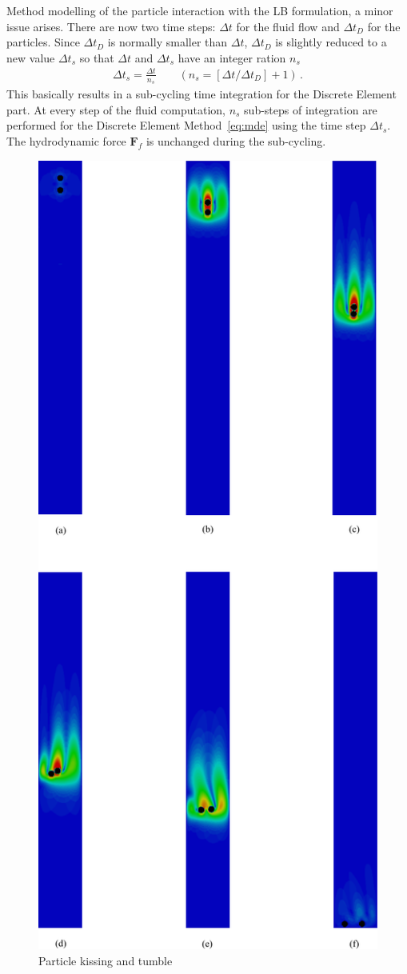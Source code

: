 Method modelling of the particle interaction with the LB formulation, a minor 
issue arises. There are now two time steps: $\Delta t$ for the fluid flow and 
$\Delta t_{D}$ for the particles. Since $\Delta t_{D}$ is normally smaller than 
$\Delta t$, $\Delta t_{D}$ is slightly reduced to a new value $\Delta t_{s}$ so 
that $\Delta t$ and $\Delta t_{s}$ have an integer ration 
$\mathit{n}_{\mathit{s}}$
%
\begin{align}
\Delta t_{s}=\frac{\Delta t}{\mathit{n}_{s}} \qquad(\mathit{n}_{s}=[\Delta t/ 
\Delta t_{D}]+1) \,.
\end{align} 
%
This basically results in a sub-cycling time integration for the Discrete 
Element part. At every step of the fluid computation, $\mathit{n}_{s}$ 
sub-steps of integration are performed for the Discrete Element 
Method~\eqref{eq:mde} using the time step $\Delta t_{s}$. The hydrodynamic 
force $\mathbf{F}_{f}$ is unchanged during the sub-cycling. 
%
\begin{figure}[htbp]
\centering
\includegraphics[height=0.9\textheight]{kissing}
\caption{Particle kissing and tumble}
\label{fig:kissing}
\end{figure}
